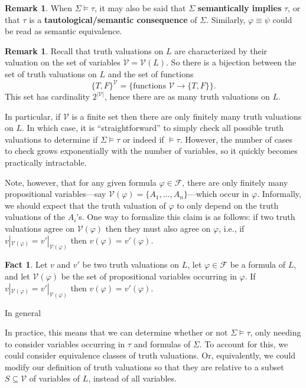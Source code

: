 \documentclass[12pt]{article}
\theoremstyle{definition}
\newtheorem{fact}[theorem]{Fact}
\newtheorem{remark}[theorem]{Remark}
\renewcommand{\phi}{\varphi}
\newcommand{\<}{\langle}
\renewcommand{\>}{\rangle}
\newcommand{\seq}{\subseteq}
\newcommand{\FF}{\mathcal{F}}
\newcommand{\VV}{\mathcal{V}}
\newcommand{\keyword}{\textbf}
\begin{document}
\begin{remark}
    When $\Sigma \vDash \tau$, it may also be said that $\Sigma$ \keyword{semantically implies} $\tau$, or that $\tau$ is a \keyword{tautological/semantic consequence} of $\Sigma$.
    Similarly, $\phi \equiv \psi$ could be read as semantic equivalence.
\end{remark}

\begin{remark}
    Recall that truth valuations on $L$ are characterized by their valuation on the set of variables $\VV = \VV(L)$.
    So there is a bijection between the set of truth valuations on $L$ and the set of functions
    \[
        \{T, F\}^\VV = \{\text{functions } \VV \to \{T, F\}\}.
    \]
    This set has cardinality $2^{|\VV|}$, hence there are as many truth valuations on $L$.

    In particular, if $\VV$ is a finite set then there are only finitely many truth valuations on $L$.
    In which case, it is ``straightforward'' to simply check all possible truth valuations to determine if $\Sigma \vDash \tau$ or indeed if $\vDash \tau$.
    However, the number of cases to check grows exponentially with the number of variables, so it quickly becomes practically intractable.

    Note, however, that for any given formula $\phi \in \FF$, there are only finitely many propositional variables---say $\VV(\phi) = \{A_1, \dots, A_n\}$---which occur in $\phi$.
    Informally, we should expect that the truth valuation of $\phi$ to only depend on the truth valuations of the $A_i$'s.
    One way to formalize this claim is as follows: if two truth valuations agree on $\VV(\phi)$ then they must also agree on $\phi$, i.e., if $v|_{\VV(\phi)} = v'|_{\VV(\phi)}$ then $v(\phi) = v'(\phi)$.
    
    \begin{fact}
        Let $v$ and $v'$ be two truth valuations on $L$, let $\phi \in \FF$ be a formula of $L$, and let $\VV(\phi)$ be the set of propositional variables occurring in $\phi$.
        If $v|_{\VV(\phi)} = v'|_{\VV(\phi)}$ then $v(\phi) = v'(\phi)$.
    \end{fact}

    In general

    In practice, this means that we can determine whether or not $\Sigma \vDash \tau$, only needing to consider variables occurring in $\tau$ and formulas of $\Sigma$.
    To account for this, we could consider equivalence classes of truth valuations.
    Or, equivalently, we could modify our definition of truth valuations so that they are relative to a subset $S \seq \VV$ of variables of $L$, instead of all variables.
\end{remark}
\end{document}
